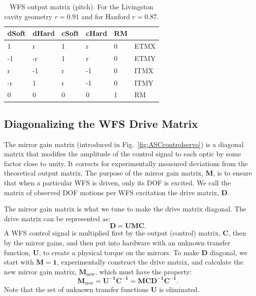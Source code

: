 \begin{table}
\centering
\caption[WFS output matrix]{WFS output matrix (pitch). For the Livingston cavity geometry
  $r=0.91$ and for Hanford $r=0.87$.}
\begin{tabular}{l l l l l l}
\hline 
dSoft & dHard & cSoft & cHard & RM & \\
\hline 
1 & r & 1 & r & 0 & ETMX\\
-1 & -r & 1 & r & 0 & ETMY \\
r & -1 & r & -1 & 0 & ITMX\\
-r & 1 & r & -1 & 0 & ITMY\\
 0 & 0 & 0 & 0 & 1 & RM\\
\hline
\end{tabular}
\label{table:output}
\end{table}



\subsection{Diagonalizing the WFS Drive Matrix}
\label{sec:mirrorgains}
The mirror gain matrix (introduced in Fig.~\ref{fig:ASCcontrolservo})
is a diagonal matrix that modifies the amplitude of the control signal
to each optic by some factor close to unity. It corrects for
experimentally measured deviations from the theoretical output
matrix. The purpose of the mirror gain matrix, $\mathbf{M}$, is to
ensure that when a particular WFS is driven, only its DOF is
excited. We call the matrix of observed DOF motions per WFS excitation
the drive matrix, $\mathbf{D}$.

The mirror gain matrix is what we tune to make the drive matrix
diagonal. The drive matrix can be represented as:
\begin{equation}
\mathbf{D} = \mathbf{U M C}.
\end{equation}
A WFS control signal is multiplied first by the output (control)
matrix, $\mathbf{C}$, then by the mirror gains, and then put into
hardware with an unknown transfer function, $\mathbf{U}$, to create a
physical torque on the mirrors. To make $\mathbf{D}$ diagonal, we
start with $\mathbf{M}=\mathbf{1}$, experimentally construct the drive
matrix, and calculate the new mirror gain matrix,
$\mathbf{M_{\mathrm{new}}}$, which must have the property:
\begin{equation}
\mathbf{M_{\mathrm{new}}} = \mathbf{U^{-1}} \mathbf{C^{-1}} = \mathbf{M C D^{-1} C^{-1}}.
\end{equation}
Note that the set of unknown transfer functions $\mathbf{U}$ is
eliminated.

